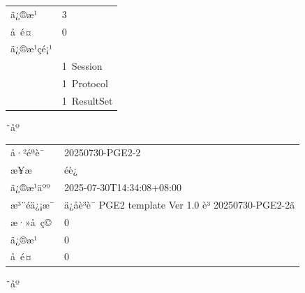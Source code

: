 \documentclass[UTF8,10pt,a4paper,fontset=fandol]{ctexart}
\newcommand{\fieldvalue}[1]{#1}
\begin{document}
\begin{center}
\begin{center}
\begin{tabular}{@{}ll@{}}
ä¿®æ¹ &
\fieldvalue{3}\\
å é¤ &
\fieldvalue{0}\\
ä¿®æ¹çé¡¹ &\\
&
\fieldvalue{1\ Session}\\
&
\fieldvalue{1\ Protocol}\\
&
\fieldvalue{1\ ResultSet}\\
\end{tabular}

\medskip

¨åº

\begin{tabular}{@{}ll@{}}
å·²éªè¯ &
\fieldvalue{20250730-PGE2-2}\\
æ¥æ &
\fieldvalue{éè¿}\\
ä¿®æ¹äºº &
\fieldvalue{2025-07-30T14:34:08+08:00}\\
æ³¨éä¿¡æ¯ &
\fieldvalue{ä¿å­è³è¯ PGE2 template Ver 1.0 è³ 20250730-PGE2-2ã}\\
æ·»å ç© &
\fieldvalue{0}\\
ä¿®æ¹ &
\fieldvalue{0}\\
å é¤ &
\fieldvalue{0}\\
\end{tabular}

\medskip

¨åº


\end{center}
\end{center}
\end{document}
